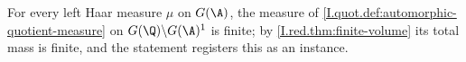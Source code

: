 For every left Haar measure $\mu$ on $G(\A)$, the measure of \cref{I.quot.def:automorphic-quotient-measure} on $G(\Q)\backslash G(\A)^1$ is finite; by \cref{I.red.thm:finite-volume} its total mass is finite, and the statement registers this as an instance.
